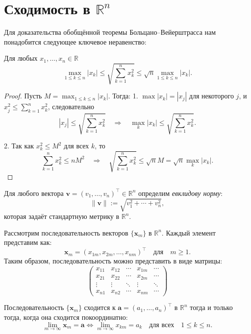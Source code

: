 \section{Сходимость в $\mathbb{R}^n$}

Для доказательства обобщённой теоремы Больцано--Вейерштрасса нам понадобится следующее ключевое неравенство:

\begin{lemma}\label{m<d<M}
Для любых $x_1,\ldots, x_n \in \mathbb{R}$ 
\[
\max_{1 \le k \le n} |x_k| \le \sqrt{\sum_{k=1}^n x_k^2} \le \sqrt{n} \max_{1\le k \le n} |x_k|.
\]
\end{lemma}
\begin{proof}
Пусть $M = \max_{1\le k \le n} |x_k|$. Тогда:
1. $\max |x_k| = |x_j|$ для некоторого $j$, и $x_j^2 \le \sum_{k=1}^n x_k^2$, следовательно
   \[ |x_j| \le \sqrt{\sum_{k=1}^n x_k^2} \quad \Rightarrow \quad \max_k |x_k| \le \sqrt{\sum_{k=1}^n x_k^2}. \]

2. Так как $x_k^2 \le M^2$ для всех $k$, то
   \[ \sum_{k=1}^n x_k^2 \le n M^2 \quad \Rightarrow \quad \sqrt{\sum_{k=1}^n x_k^2} \le \sqrt{n} M = \sqrt{n} \max_k |x_k|. \]
\end{proof}

Для любого вектора $\mathbf{v} = (v_1,\ldots, v_n)^\top \in \mathbb{R}^n$ определим \textit{евклидову норму}:
\[
 \| \mathbf{v} \| := \sqrt{ v_1^2 + \cdots + v_n^2 },
\]
которая задаёт стандартную метрику в $\mathbb{R}^n$.

Рассмотрим последовательность векторов $\{\mathbf{x}_m\}$ в $\mathbb{R}^n$. Каждый элемент представим как:
\[
\mathbf{x}_m = (x_{1m}, x_{2m}, \ldots, x_{nm})^\top \quad \text{для} \quad m \geq 1.
\]
Таким образом, последовательность можно представить в виде матрицы:
\[
\begin{pmatrix}
x_{11} & x_{12} & \cdots & x_{1m} & \cdots \\
x_{21} & x_{22} & \cdots & x_{2m} & \cdots \\
\vdots & \vdots & \ddots & \vdots & \ddots \\
x_{n1} & x_{n2} & \cdots & x_{nm} & \cdots
\end{pmatrix}
\]

\begin{lemma}
Последовательность $\{\mathbf{x}_m\}$ сходится к $\mathbf{a} = (a_1, \ldots, a_n)^\top$ в $\mathbb{R}^n$ тогда и только тогда, когда она сходится покоординатно:
\[
\lim_{m \to \infty} \mathbf{x}_m = \mathbf{a} \iff \lim_{m \to \infty} x_{km} = a_k \quad \text{для всех} \quad 1 \leq k \leq n.
\]
\end{lemma}

